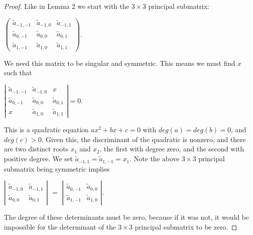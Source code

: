 \documentclass{article}
\begin{document}
\begin{proof}
  Like in Lemma 2 we start with the $3 \times 3$ principal submatrix:
  \begin{center}
    $\left(\begin{array}{ccc} \tilde{a}_{-1,-1} & \tilde{a}_{-1,0} & \tilde{a}_{-1,1} \\ \tilde{a}_{0,-1} & \tilde{a}_{0,0} & \tilde{a}_{0,1} \\ \tilde{a}_{1,-1} & \tilde{a}_{1,0} & \tilde{a}_{1,1} \end{array}\right)$. 
  \end{center}
  We need this matrix to be singular and symmetric. This means we must find $x$ such that
  \begin{center}
    $\left|\begin{array}{ccc} \tilde{a}_{-1,-1} & \tilde{a}_{-1,0} & x \\ \tilde{a}_{0,-1} & \tilde{a}_{0,0} & \tilde{a}_{0,1} \\ x & \tilde{a}_{1,0} & \tilde{a}_{1,1} \end{array}\right| = 0$.
  \end{center}   
  This is a quadratic equation $ax^{2}+bx+c=0$ with $deg(a) = deg(b) = 0$, and $deg(c) > 0$. Given this, the discriminant of the quadratic is nonzero, and there are two distinct roots $x_{1}$ and $x_{2}$, the first with degree zero, and the second with positive degree. We set $\tilde{a}_{-1,1} = \tilde{a}_{1,-1} = x_{1}$. Note the above $3 \times 3$ principal submatrix being symmetric implies
  \begin{center}
    $\left|\begin{array}{cc} \tilde{a}_{-1,0} & \tilde{a}_{-1,1} \\ \tilde{a}_{0,0} & \tilde{a}_{0,1} \end{array}\right|$ \hspace{.1 in} $=$ \hspace{.1 in } $\left|\begin{array}{cc} \tilde{a}_{0,-1} & \tilde{a}_{0,0} \\ \tilde{a}_{1,-1} & \tilde{a}_{1,0} \end{array}\right|$.
  \end{center}
  The degree of these determinants must be zero, because if it was not, it would be impossible for the determinant of the $3 \times 3$ principal submatrix to be zero.
  

\end{proof}
\end{document}
